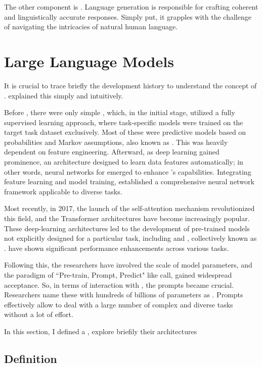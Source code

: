 The other component is \textbf{{\nlg}}. Language generation is responsible for crafting coherent and linguistically accurate responses. Simply put, it grapples with the challenge of navigating the intricacies of natural human language. 



\section{Large Language Models}


It is crucial to trace briefly the development history to understand the concept of {\llm}. \citet{liu_prompting_nodate} explained this simply and intuitively.

Before {\llm}, there were only simple {\lm}, which, in the initial stage, utilized a fully supervised learning approach, where task-specific models were trained on the target task dataset exclusively. Most of these were predictive models based on probabilities and Markov assumptions, also known as {\slm}. This was heavily dependent on feature engineering. Afterward, as deep learning gained prominence, an architecture designed to learn data features automatically; in other words, neural networks for {\nlp} emerged to enhance {\lm}’s capabilities. Integrating feature learning and model training, {\nlm} established a comprehensive neural network framework applicable to diverse {\nlp} tasks.

Most recently, in 2017, the launch of the self-attention mechanism revolutionized this field, and the Transformer architectures have become increasingly popular. These deep-learning architectures led to the development of pre-trained models not explicitly designed for a particular task, including {\bert} and {\gpt}, collectively known as {\plm}. {\plm} have shown significant performance enhancements across various {\nlp} tasks.

Following this, the researchers have involved the scale of model parameters, and the paradigm of “Pre-train, Prompt, Predict" like \citet{liu_prompting_nodate} call, gained widespread acceptance. So, in terms of interaction with {\lm}, the prompts became crucial. Researchers name these {\plm} with hundreds of billions of parameters as  {\llm}. Prompts effectively allow {\llm} to deal with a large number of complex and diverse tasks without a lot of effort.

In this section, I defined a {\llm}, explore briefily their architectures 


\subsection{Definition}

